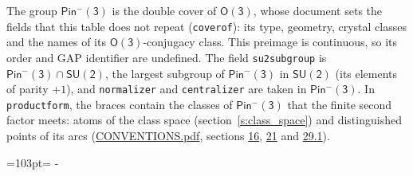 \documentclass[10pt,a4paper]{article}
\newcommand{\needspace}[1]{\par\penalty-100\begingroup\dimen0=#1\relax\dimen2=\pagegoal
  \advance\dimen2-\pagetotal\ifdim\dimen0>\dimen2\relax\ifdim\dimen2>0pt\vfil\break\fi\fi
  \endgroup}
\numberwithin{equation}{section}
\newcommand{\grp}[1]{\mathsf{#1}}
\begin{document}
\leavevmode\label{n:group.preimage}The group $\grp{Pin^{-}(3)}$ is the double cover of \href{../../../rotation/data/pdf/O3.pdf}{$\grp{O(3)}$}, whose document sets the fields that this table does not repeat (\texttt{coverof}): its type, geometry, crystal classes and the names of its \href{../../../rotation/data/pdf/O3.pdf}{$\grp{O(3)}$}-conjugacy class. This preimage is continuous, so its order and GAP identifier are undefined. The field \texttt{su2subgroup} is $\grp{Pin^{-}(3)} \cap \grp{SU(2)}$, the largest subgroup of $\grp{Pin^{-}(3)}$ in $\grp{SU(2)}$ (its elements of parity $+1$), and \texttt{normalizer} and \texttt{centralizer} are taken in $\grp{Pin^{-}(3)}$.
In \texttt{productform}, the braces contain the classes of $\grp{Pin^{-}(3)}$ that the finite second factor meets: atoms of the class space (section~\ref{s:class_space}) and distinguished points of its arcs (\href{../../CONVENTIONS.pdf}{CONVENTIONS.pdf}, sections \href{../../../rotation/CONVENTIONS.pdf\#conv.16}{16}, \href{../../CONVENTIONS.pdf\#conv.21}{21} and \href{../../CONVENTIONS.pdf\#conv.29.1}{29.1}).
\needspace{103pt}
\end{document}
